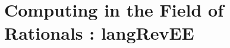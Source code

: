 \documentclass[preprint]{sigplanconf}
\begin{document}

\section{Computing in the Field of Rationals : {{langRevEE}} }
\label{sec:rat}
\end{document}
